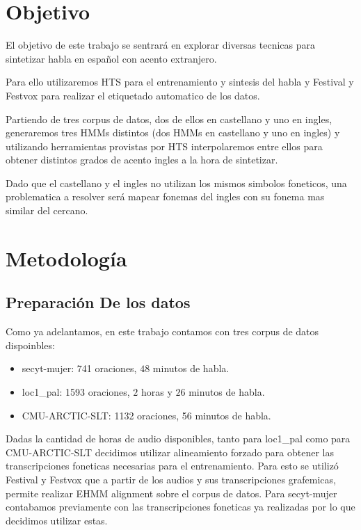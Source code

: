 \section{Objetivo}

El objetivo de este trabajo se sentrará en explorar diversas tecnicas para sintetizar habla en español con acento extranjero. 


Para ello utilizaremos HTS para el entrenamiento y sintesis del habla y Festival y Festvox para realizar el etiquetado automatico de los datos.


Partiendo de tres corpus de datos, dos de ellos en castellano y uno en ingles, generaremos tres HMMs distintos (dos HMMs en castellano y uno en ingles) y utilizando herramientas provistas por HTS interpolaremos entre ellos para obtener distintos grados de acento ingles a la hora de sintetizar.


Dado que el castellano y el ingles no utilizan los mismos simbolos foneticos, una problematica a resolver será mapear fonemas del ingles con su fonema mas similar del cercano.

\break

\section{Metodología}

\subsection{Preparación De los datos}

Como ya adelantamos, en este trabajo contamos con tres corpus de datos dispoinbles:

\begin{itemize}
\item secyt-mujer: 741 oraciones, $48$ minutos de habla.
\item loc1\_pal: 1593 oraciones, $2$ horas y $26$ minutos de habla.
\item CMU-ARCTIC-SLT: 1132 oraciones, 56 minutos de habla.
\end{itemize}

Dadas la cantidad de horas de audio disponibles, tanto para loc1\_pal como para CMU-ARCTIC-SLT decidimos utilizar alineamiento forzado para obtener las transcripciones foneticas necesarias para el entrenamiento. Para esto se utilizó Festival y Festvox que a partir de los audios y sus transcripciones grafemicas, permite realizar EHMM alignment sobre el corpus de datos. Para secyt-mujer contabamos previamente con las transcripciones foneticas ya realizadas por lo que decidimos utilizar estas. 


